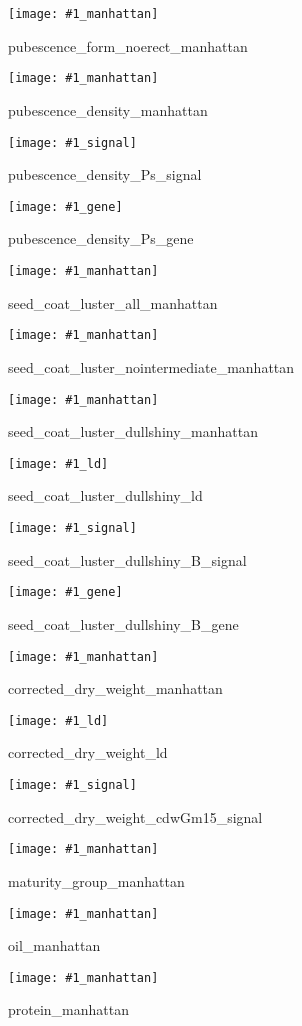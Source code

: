 \documentclass[12pt]{article}
\newenvironment{cfigure}
	{\begin{figure} \centering}
	{\end{figure}}
\newcommand{\manhattanplot}[1]{
\begin{cfigure}
	\texttt{[image: \#1\_manhattan]}
	\caption{#1\_manhattan}
	\label{#1_manhattan}
\end{cfigure}

\clearpage}
\newcommand{\signalplot}[1]{
\begin{cfigure}
	\texttt{[image: \#1\_signal]}
	\caption{#1\_signal}
	\label{#1_signal}
\end{cfigure}

\clearpage}
\newcommand{\geneplot}[1]{
\begin{cfigure}
	\texttt{[image: \#1\_gene]}
	\caption{#1\_gene}
	\label{#1_gene}
\end{cfigure}

\clearpage}
\newcommand{\ldplot}[1]{
	\begin{cfigure}
		\texttt{[image: \#1\_ld]}
		\caption{#1\_ld}
		\label{#1_ld}
	\end{cfigure}

\clearpage}
\begin{document}
\manhattanplot{pubescence_form_noerect}

\manhattanplot{pubescence_density}
\signalplot{pubescence_density_Ps}
\geneplot{pubescence_density_Ps}

\manhattanplot{seed_coat_luster_all}

\manhattanplot{seed_coat_luster_nointermediate}

\manhattanplot{seed_coat_luster_dullshiny}
\ldplot{seed_coat_luster_dullshiny}
\signalplot{seed_coat_luster_dullshiny_B}
\geneplot{seed_coat_luster_dullshiny_B}

\manhattanplot{corrected_dry_weight}
\ldplot{corrected_dry_weight}
\signalplot{corrected_dry_weight_cdwGm15}

\manhattanplot{maturity_group}

\manhattanplot{oil}

\manhattanplot{protein}
\end{document}
